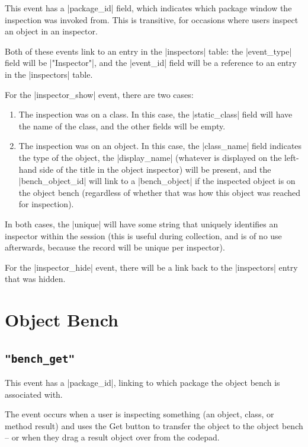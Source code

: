 \documentclass{report}
\begin{document}
This event has a |package_id| field, which indicates which package window the
inspection was invoked from.  This is transitive, for occasions where users
inspect an object in an inspector.

Both of these events link to an entry in the |inspectors| table: the
|event_type| field will be |"Inspector"|, and the |event_id| field will be a
reference to an entry in the |inspectors| table.

For the |inspector_show| event, there are two cases:

\begin{enumerate}
\item The inspection was on a class.  In this case, the |static_class| field
  will have the name of the class, and the other fields will be empty.
\item The inspection was on an object.  In this case, the |class_name| field
  indicates the type of the object, the |display_name| (whatever is displayed
  on the left-hand side of the title in the object inspector) will be present,
  and the |bench_object_id| will link to a |bench_object| if the inspected
  object is on the object bench (regardless of whether that was how this
  object was reached for inspection).
\end{enumerate}

In both cases, the |unique| will have some string that uniquely identifies an
inspector within the session (this is useful during collection, and is of no
use afterwards, because the record will be unique per inspector).

For the |inspector_hide| event, there will be a link back to the |inspectors|
entry that was hidden.

\section{Object Bench}

\subsection{\lstinline!"bench_get"!}

This event has a |package_id|, linking to which package the object
bench is associated with.

The event occurs when a user is inspecting something (an object,
class, or method result) and uses the Get button to transfer the
object to the object bench -- or when they drag a result object over
from the codepad.
  
\end{document}
